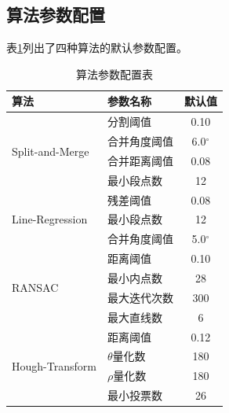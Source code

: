 \documentclass[12pt,a4paper]{article}
\begin{document}
\subsection{算法参数配置}

表\ref{tab:params}列出了四种算法的默认参数配置。

\begin{table}[H]
\centering
\caption{算法参数配置表}
\label{tab:params}
\begin{tabular}{llc}
\toprule
算法 & 参数名称 & 默认值 \\
\midrule
\multirow{4}{*}{Split-and-Merge} & 分割阈值 & 0.10 \\
 & 合并角度阈值 & 6.0$^\circ$ \\
 & 合并距离阈值 & 0.08 \\
 & 最小段点数 & 12 \\
\midrule
\multirow{3}{*}{Line-Regression} & 残差阈值 & 0.08 \\
 & 最小段点数 & 12 \\
 & 合并角度阈值 & 5.0$^\circ$ \\
\midrule
\multirow{4}{*}{RANSAC} & 距离阈值 & 0.10 \\
 & 最小内点数 & 28 \\
 & 最大迭代次数 & 300 \\
 & 最大直线数 & 6 \\
\midrule
\multirow{4}{*}{Hough-Transform} & 距离阈值 & 0.12 \\
 & $\theta$量化数 & 180 \\
 & $\rho$量化数 & 180 \\
 & 最小投票数 & 26 \\
\bottomrule
\end{tabular}
\end{table}
\end{document}

